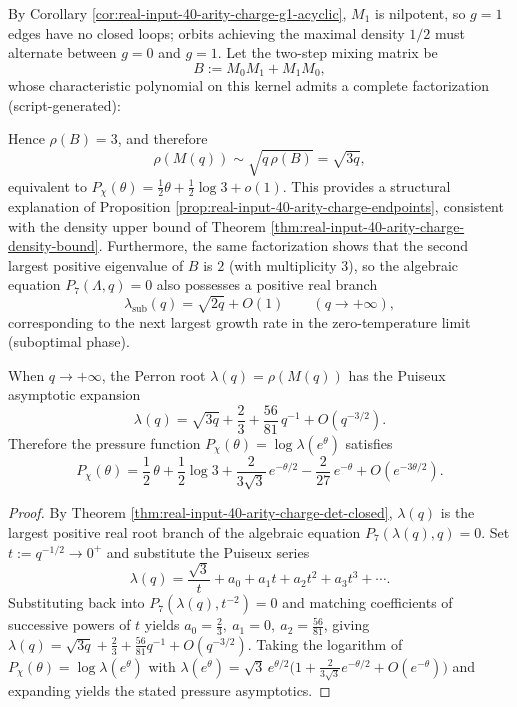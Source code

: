 \begin{remark}\label{rem:real-input-40-arity-charge-large-bias-mechanism}
By Corollary \ref{cor:real-input-40-arity-charge-g1-acyclic}, $M_1$ is nilpotent, so $g=1$ edges have no closed loops;
orbits achieving the maximal density $1/2$ must alternate between $g=0$ and $g=1$.
Let the two-step mixing matrix be
\[
B:=M_0M_1+M_1M_0,
\]
whose characteristic polynomial on this kernel admits a complete factorization (script-generated):

Hence $\rho(B)=3$, and therefore
\[
\rho(M(q))\sim\sqrt{q\,\rho(B)}=\sqrt{3q},
\]
equivalent to $P_\chi(\theta)=\frac12\theta+\frac12\log 3+o(1)$.
This provides a structural explanation of Proposition \ref{prop:real-input-40-arity-charge-endpoints}, consistent with the density upper bound of Theorem \ref{thm:real-input-40-arity-charge-density-bound}.
Furthermore, the same factorization shows that the second largest positive eigenvalue of \(B\) is \(2\) (with multiplicity \(3\)), so the algebraic equation \(P_7(\Lambda,q)=0\) also possesses a positive real branch
\[
\lambda_{\mathrm{sub}}(q)=\sqrt{2q}+O(1)\qquad(q\to+\infty),
\]
corresponding to the next largest growth rate in the zero-temperature limit (suboptimal phase).
\end{remark}
\begin{proposition}\label{prop:real-input-40-arity-charge-zero-temp-expansion}
When $q\to+\infty$, the Perron root $\lambda(q)=\rho(M(q))$ has the Puiseux asymptotic expansion
\[
\lambda(q)=\sqrt{3q}+\frac23+\frac{56}{81}\,q^{-1}+O(q^{-3/2}).
\]
Therefore the pressure function $P_\chi(\theta)=\log\lambda(e^\theta)$ satisfies
\[
P_\chi(\theta)=\frac12\,\theta+\frac12\log 3+\frac{2}{3\sqrt3}\,e^{-\theta/2}-\frac{2}{27}\,e^{-\theta}+O(e^{-3\theta/2}).
\]
\end{proposition}
\begin{proof}
By Theorem \ref{thm:real-input-40-arity-charge-det-closed}, $\lambda(q)$ is the largest positive real root branch of the algebraic equation $P_7(\lambda(q),q)=0$.
Set $t:=q^{-1/2}\to 0^+$ and substitute the Puiseux series
\[
\lambda(q)=\frac{\sqrt3}{t}+a_0+a_1t+a_2t^2+a_3t^3+\cdots.
\]
Substituting back into $P_7(\lambda(q),t^{-2})=0$ and matching coefficients of successive powers of $t$ yields $a_0=\frac23,\ a_1=0,\ a_2=\frac{56}{81}$,
giving $\lambda(q)=\sqrt{3q}+\frac23+\frac{56}{81}q^{-1}+O(q^{-3/2})$.
Taking the logarithm of
\(
P_\chi(\theta)=\log\lambda(e^\theta)
\)
with $\lambda(e^\theta)=\sqrt{3}\,e^{\theta/2}\bigl(1+\frac{2}{3\sqrt3}e^{-\theta/2}+O(e^{-\theta})\bigr)$ and expanding yields the stated pressure asymptotics.
\end{proof}




